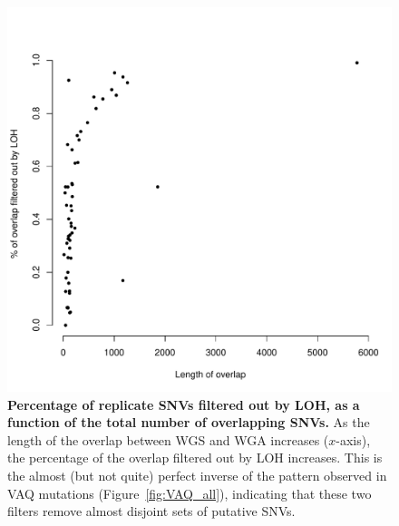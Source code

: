 \documentclass[11pt]{article} %
\begin{document}
\begin{figure}
\centerline{
\includegraphics[width=5in]{./LOH_VAQ/LOH_all.pdf} }
\caption{\textbf{Percentage of replicate SNVs filtered out by LOH, as a function of the total number of overlapping SNVs.} As the length of the overlap between WGS and WGA increases ($x$-axis), the percentage of the overlap filtered out by LOH increases. This is the almost (but not quite) perfect inverse of the pattern observed in VAQ mutations (Figure~\ref{fig:VAQ_all}), indicating that these two filters remove almost disjoint sets of putative SNVs.}
\label{fig:LOH_all}
\end{figure}
\end{document}
